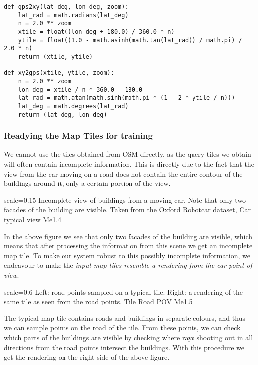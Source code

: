 \begin{verbatim}
def gps2xy(lat_deg, lon_deg, zoom):
    lat_rad = math.radians(lat_deg)
    n = 2.0 ** zoom
    xtile = float((lon_deg + 180.0) / 360.0 * n)
    ytile = float((1.0 - math.asinh(math.tan(lat_rad)) / math.pi) / 2.0 * n)
    return (xtile, ytile)

def xy2gps(xtile, ytile, zoom):
    n = 2.0 ** zoom
    lon_deg = xtile / n * 360.0 - 180.0
    lat_rad = math.atan(math.sinh(math.pi * (1 - 2 * ytile / n)))
    lat_deg = math.degrees(lat_rad)
    return (lat_deg, lon_deg)
\end{verbatim}

\subsubsection{Readying the Map Tiles for training}
We cannot use the tiles obtained from OSM directly, as the query tiles we obtain will often contain incomplete information. This is directly due to the fact that the view from the car moving on a road does not contain the entire contour of the buildings around it, only a certain portion of the view. 

{scale=0.15}%
{Incomplete view of buildings from a moving car. Note that only two facades of the building are visible. Taken from the Oxford Robotcar dataset,  \cite{newman2017}}%
{Car typical view}%
{Me1.4}

In the above figure we see that only two facades of the building are visible, which means that after processing the information from this scene we get an incomplete map tile. To make our system robust to this possibly incomplete information, we endeavour to make the  \textit{input map tiles resemble a rendering from the car point of view}.

{scale=0.6}%
{Left: road points sampled on a typical tile. Right: a rendering of the same tile as seen from the road points,  \cite{newman2017}}%
{Tile Road POV}%
{Me1.5}

The typical map tile contains roads and buildings in separate colours, and thus we can sample points on the road of the tile. From these points, we can check which parts of the buildings are visible by checking where rays shooting out in all directions from the road points intersect the buildings. With this procedure we get the rendering on the right side of the above figure. 

